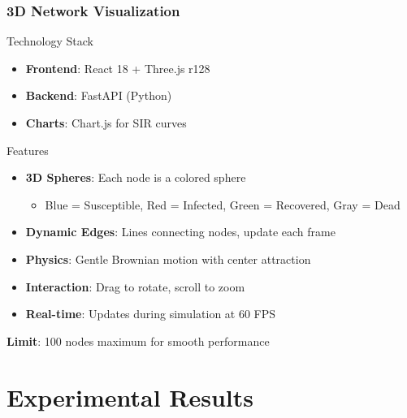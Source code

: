 \documentclass{beamer}
\begin{document}
\begin{frame}
\frametitle{3D Network Visualization}

\begin{block}{Technology Stack}
\begin{itemize}
    \item \textbf{Frontend}: React 18 + Three.js r128
    \item \textbf{Backend}: FastAPI (Python)
    \item \textbf{Charts}: Chart.js for SIR curves
\end{itemize}
\end{block}

\begin{block}{Features}
\begin{itemize}
    \item \textbf{3D Spheres}: Each node is a colored sphere
    \begin{itemize}
        \item Blue = Susceptible, Red = Infected, Green = Recovered, Gray = Dead
    \end{itemize}
    \item \textbf{Dynamic Edges}: Lines connecting nodes, update each frame
    \item \textbf{Physics}: Gentle Brownian motion with center attraction
    \item \textbf{Interaction}: Drag to rotate, scroll to zoom
    \item \textbf{Real-time}: Updates during simulation at 60 FPS
\end{itemize}
\end{block}

\textbf{Limit}: 100 nodes maximum for smooth performance
\end{frame}

\section{Experimental Results}
\end{document}
